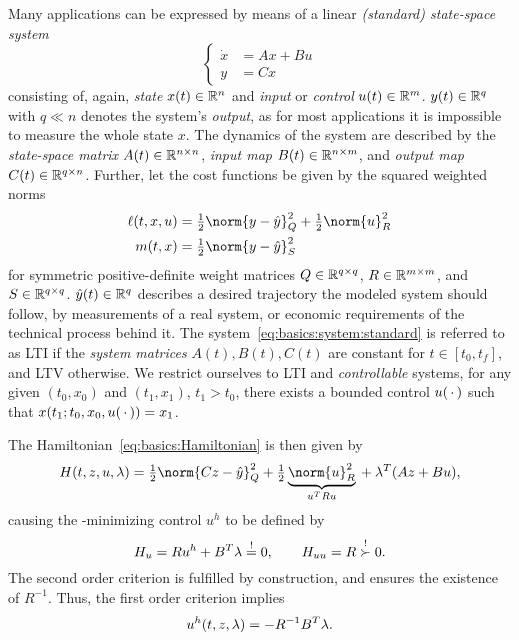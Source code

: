 Many applications can be expressed by means of a
linear \emph{(standard) state-space system}
\begin{equation}
\label{eq:basics:system:standard}
\left\{
\begin{aligned}
  \dot x &= Ax + Bu \\
  y &= Cx
\end{aligned}
\right.
\end{equation}
consisting of, again, \emph{state} $x(t)\in\mathbb{R}^n$ and \emph{input} or \emph{control} $u(t)\in\mathbb{R}^m$.
$y(t) \in\mathbb{R}^q$ with $q \ll n$ denotes the system's \emph{output},
as for most applications it is impossible to measure the whole state $x$.
The dynamics of the system are described by the
\emph{state-space matrix} $A(t) \in \mathbb{R}^{n\times n}$,
\emph{input map} $B(t) \in\mathbb{R}^{n \times m}$,
and
\emph{output map} $C(t) \in\mathbb{R}^{q\times n}$.
Further, let the cost functions be given by the squared weighted norms
\begin{equation}
\label{eq:basics:LQR:cost}
\begin{aligned}
  \ell(t, x, u)
  &= \tfrac{1}{2}\norm{y - \hat y}_Q^2 + \tfrac{1}{2}\norm{u}_R^2 \\
  m(t, x)
  &= \tfrac{1}{2} \norm{y - \hat y}_S^2
\end{aligned}
\end{equation}
for symmetric positive-definite weight matrices
$Q\in\mathbb{R}^{q\times q}$,
$R\in\mathbb{R}^{m\times m}$, and
$S\in\mathbb{R}^{q\times q}$.
$\hat y(t) \in\mathbb{R}^q$ describes a desired trajectory the modeled system should follow,
\eg by measurements of a real system, or economic requirements of the technical process behind it.
The system~\eqref{eq:basics:system:standard} is referred to as \ac{LTI}
if the \emph{system matrices} $A(t), B(t), C(t)$ are constant for $t\in [t_0,t_f]$,
and \ac{LTV} otherwise.
We restrict ourselves to \ac{LTI} and \emph{controllable} systems,
\ie for any given $(t_0, x_0)$ and $(t_1, x_1)$, $t_1 > t_0$,
there exists a bounded control $u(\optional{})$ such that $x(t_1; t_0, x_0, u(\optional{})) = x_1$.

The Hamiltonian~\eqref{eq:basics:Hamiltonian} is then given by
\begin{equation*}
  \Ham(t,z,u,\lambda) =
  \onehalf \norm{Cz - \hat y}_Q^2 +
  \onehalf \underbrace{
    \norm{u}_R^2
  }_{u^\T R u}
  {} +
  \lambda^\T (Az + Bu)
  ,
\end{equation*}
causing the \Ham-minimizing control $u^h$ to be defined by
\begin{equation*}
  H_u = Ru^h + B^T \lambda \overset{!}{=} 0,
  \qquad
  H_{uu} = R \overset{!}{\succ} 0.
\end{equation*}
The second order criterion is fulfilled by construction,
and ensures the existence of $R^{-1}$.
Thus, the first order criterion implies
\begin{equation}
\label{eq:basics:LQR:uh}
  u^h(t, z, \lambda) = -R^{-1} B^T \lambda
  .
\end{equation}

